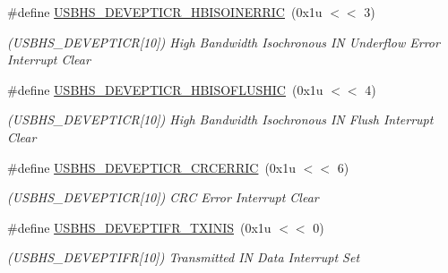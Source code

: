 \begin{DoxyCompactItemize}
\mbox{\label{group__SAME70__USBHS_ga545da4a14b5d0a1116acefa6b9f9ef06}} 
\#define \mbox{\hyperlink{group__SAME70__USBHS_ga545da4a14b5d0a1116acefa6b9f9ef06}{U\+S\+B\+H\+S\+\_\+\+D\+E\+V\+E\+P\+T\+I\+C\+R\+\_\+\+H\+B\+I\+S\+O\+I\+N\+E\+R\+R\+IC}}~(0x1u $<$$<$ 3)
\begin{DoxyCompactList}\small\item\em (U\+S\+B\+H\+S\+\_\+\+D\+E\+V\+E\+P\+T\+I\+CR\mbox{[}10\mbox{]}) High Bandwidth Isochronous IN Underflow Error Interrupt Clear \end{DoxyCompactList}\item 
\mbox{\label{group__SAME70__USBHS_gaf7a950038e2e41020695d1a43f25593b}} 
\#define \mbox{\hyperlink{group__SAME70__USBHS_gaf7a950038e2e41020695d1a43f25593b}{U\+S\+B\+H\+S\+\_\+\+D\+E\+V\+E\+P\+T\+I\+C\+R\+\_\+\+H\+B\+I\+S\+O\+F\+L\+U\+S\+H\+IC}}~(0x1u $<$$<$ 4)
\begin{DoxyCompactList}\small\item\em (U\+S\+B\+H\+S\+\_\+\+D\+E\+V\+E\+P\+T\+I\+CR\mbox{[}10\mbox{]}) High Bandwidth Isochronous IN Flush Interrupt Clear \end{DoxyCompactList}\item 
\mbox{\label{group__SAME70__USBHS_ga113daf9e53959a559925a35d5e5fd7cd}} 
\#define \mbox{\hyperlink{group__SAME70__USBHS_ga113daf9e53959a559925a35d5e5fd7cd}{U\+S\+B\+H\+S\+\_\+\+D\+E\+V\+E\+P\+T\+I\+C\+R\+\_\+\+C\+R\+C\+E\+R\+R\+IC}}~(0x1u $<$$<$ 6)
\begin{DoxyCompactList}\small\item\em (U\+S\+B\+H\+S\+\_\+\+D\+E\+V\+E\+P\+T\+I\+CR\mbox{[}10\mbox{]}) C\+RC Error Interrupt Clear \end{DoxyCompactList}\item 
\mbox{\label{group__SAME70__USBHS_gad5da0b534cb39cd8d5476f606569a6d6}} 
\#define \mbox{\hyperlink{group__SAME70__USBHS_gad5da0b534cb39cd8d5476f606569a6d6}{U\+S\+B\+H\+S\+\_\+\+D\+E\+V\+E\+P\+T\+I\+F\+R\+\_\+\+T\+X\+I\+N\+IS}}~(0x1u $<$$<$ 0)
\begin{DoxyCompactList}\small\item\em (U\+S\+B\+H\+S\+\_\+\+D\+E\+V\+E\+P\+T\+I\+FR\mbox{[}10\mbox{]}) Transmitted IN Data Interrupt Set \end{DoxyCompactList}\item 

\end{DoxyCompactItemize}
